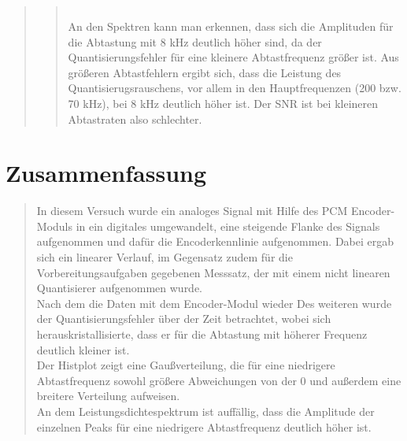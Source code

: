 \begin{quote}
\begin{quote}
\begin{center}
\begin{tabular}{ll}
            \end{tabular}
        \end{center}
        \vspace{2em}
        
        An den Spektren kann man erkennen, dass sich die Amplituden für die Abtastung mit 8 kHz deutlich höher sind, da
        der Quantisierungsfehler für eine kleinere Abtastfrequenz größer ist. Aus größeren Abtastfehlern ergibt sich,
        dass die Leistung des Quantisierugsrauschens, vor allem in den Hauptfrequenzen (200 bzw. 70 kHz), bei 8 kHz
        deutlich höher ist. Der SNR ist bei kleineren Abtastraten also schlechter.
        
    \end{quote}
    
\end{quote}

\section{Zusammenfassung}
\begin{quote}
	In diesem Versuch wurde ein analoges Signal mit Hilfe des PCM Encoder-Moduls in ein digitales umgewandelt, eine
	steigende Flanke des Signals aufgenommen und dafür die Encoderkennlinie aufgenommen. Dabei ergab sich ein linearer
	Verlauf, im Gegensatz zudem für die Vorbereitungsaufgaben gegebenen Messsatz, der mit einem nicht linearen Quantisierer
	aufgenommen wurde.\\
	Nach dem die Daten mit dem Encoder-Modul wieder 
	Des weiteren wurde der Quantisierungsfehler über der Zeit betrachtet, wobei sich herauskristallisierte, dass er für die
	Abtastung mit höherer Frequenz deutlich kleiner ist.\\
	Der Histplot zeigt eine Gaußverteilung, die für eine niedrigere Abtastfrequenz sowohl größere Abweichungen von der 0
	und außerdem eine breitere Verteilung aufweisen.\\
	An dem Leistungsdichtespektrum ist auffällig, dass die Amplitude der einzelnen Peaks für eine niedrigere Abtastfrequenz
	deutlich höher ist.
 
 
    
\end{quote} %


